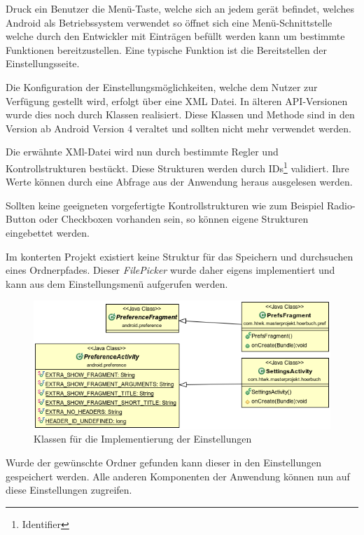 Druck ein Benutzer die Menü-Taste, welche sich an jedem gerät befindet, welches Android als Betriebssystem verwendet so öffnet sich eine Menü-Schnittstelle welche durch den Entwickler mit Einträgen befüllt werden kann um bestimmte Funktionen bereitzustellen. Eine typische Funktion ist die Bereitstellen der Einstellungsseite.

Die Konfiguration der Einstellungsmöglichkeiten, welche dem Nutzer zur Verfügung gestellt wird, erfolgt über eine XML Datei. In älteren API-Versionen wurde dies noch durch Klassen realisiert. Diese Klassen und Methode sind in den Version ab Android Version 4 veraltet und sollten nicht mehr verwendet werden.

Die erwähnte XMl-Datei wird nun durch bestimmte Regler und Kontrollstrukturen bestückt. Diese Strukturen werden durch IDs\footnote{Identifier} validiert. Ihre Werte können durch eine Abfrage aus der Anwendung heraus ausgelesen werden.

Sollten keine geeigneten vorgefertigte Kontrollstrukturen wie zum Beispiel Radio-Button oder Checkboxen vorhanden sein, so können eigene Strukturen eingebettet werden.

Im konterten Projekt existiert keine Struktur für das Speichern und durchsuchen eines Ordnerpfades. Dieser \textit{FilePicker} wurde daher eigens implementiert und kann aus dem Einstellungsmenü aufgerufen werden.

\begin{center}
\begin{figure}
\includegraphics[scale=0.7]{images/settings}
\caption{Klassen für die Implementierung der Einstellungen}
\label{settings}
\end{figure}
\end{center}

Wurde der gewünschte Ordner gefunden kann dieser in den Einstellungen gespeichert werden. Alle anderen Komponenten der Anwendung können nun auf diese Einstellungen zugreifen.

